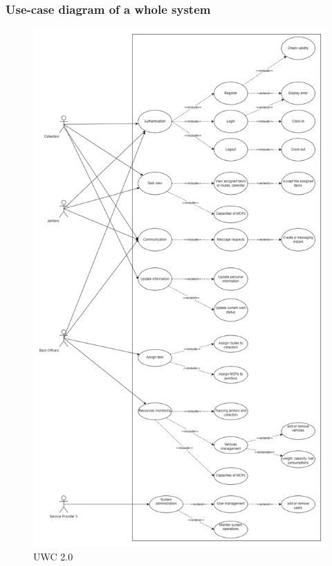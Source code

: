 \documentclass[a4paper, 13pt]{article}
\begin{document}
\subsubsection*{Use-case diagram of a whole system}
\begin{center}
    \begin{figure}
        \centering
        \includegraphics[scale=0.3]{requirement/systemUC.png}
        \caption{UWC 2.0}
        \label{fig:my_label}
    \end{figure}
\end{center}
\end{document}
